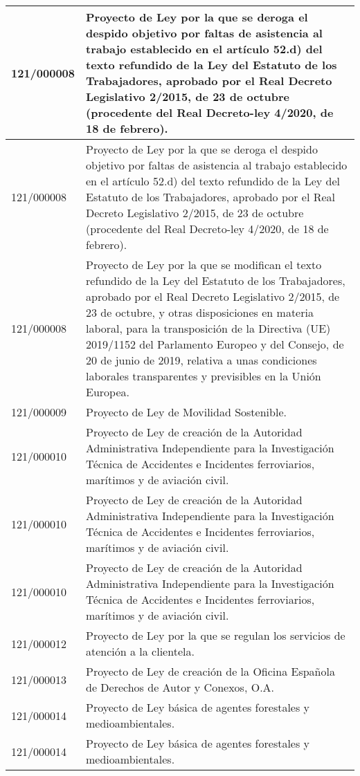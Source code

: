 {\begin{table}[H]
\begin{center}
\begin{tabularx}{\linewidth}{| l | X |}
\hline
121/000008 & Proyecto de Ley por la que se deroga el despido objetivo por faltas de asistencia al trabajo establecido en el artículo 52.d) del texto refundido de la Ley del Estatuto de los Trabajadores, aprobado por el Real Decreto Legislativo 2/2015, de 23 de octubre (procedente del Real Decreto-ley 4/2020, de 18 de febrero). \\
\hline
121/000008 & Proyecto de Ley por la que se deroga el despido objetivo por faltas de asistencia al trabajo establecido en el artículo 52.d) del texto refundido de la Ley del Estatuto de los Trabajadores, aprobado por el Real Decreto Legislativo 2/2015, de 23 de octubre (procedente del Real Decreto-ley 4/2020, de 18 de febrero). \\
\hline
121/000008 & Proyecto de Ley por la que se modifican el texto refundido de la Ley del Estatuto de los Trabajadores, aprobado por el Real Decreto Legislativo 2/2015, de 23 de octubre, y otras disposiciones en materia laboral, para la transposición de la Directiva (UE) 2019/1152 del Parlamento Europeo y del Consejo, de 20 de junio de 2019, relativa a unas condiciones laborales transparentes y previsibles en la Unión Europea. \\
\hline
121/000009 & Proyecto de Ley de Movilidad Sostenible. \\
\hline
121/000010 & Proyecto de Ley de creación de la Autoridad Administrativa Independiente para la Investigación Técnica de Accidentes e Incidentes ferroviarios, marítimos y de aviación civil. \\
\hline
121/000010 & Proyecto de Ley de creación de la Autoridad Administrativa Independiente para la Investigación Técnica de Accidentes e Incidentes ferroviarios, marítimos y de aviación civil. \\
\hline
121/000010 & Proyecto de Ley de creación de la Autoridad Administrativa Independiente para la Investigación Técnica de Accidentes e Incidentes ferroviarios, marítimos y de aviación civil. \\
\hline
121/000012 & Proyecto de Ley por la que se regulan los servicios de atención a la clientela. \\
\hline
121/000013 & Proyecto de Ley de creación de la Oficina Española de Derechos de Autor y Conexos, O.A. \\
\hline
121/000014 & Proyecto de Ley básica de agentes forestales y medioambientales. \\
\hline
121/000014 & Proyecto de Ley básica de agentes forestales y medioambientales. \\

\end{tabularx}
\end{center}
\end{table}}
